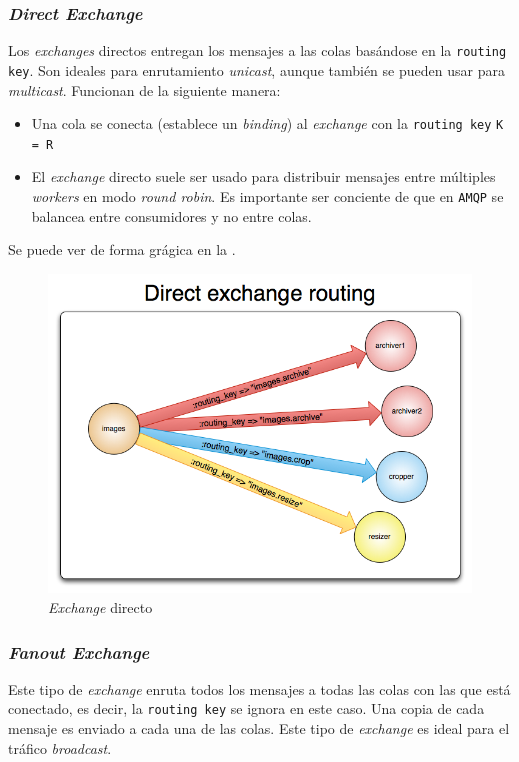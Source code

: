 \subsubsection{\emph{Direct Exchange}}

Los \emph{exchanges} directos entregan los mensajes a las colas basándose en
la \texttt{routing key}. Son ideales para enrutamiento \emph{unicast}, aunque
también se pueden usar para \emph{multicast}. Funcionan de la siguiente manera:

\begin{itemize}\itemsep1pt \parskip0pt 
\item Una cola se conecta (establece un \emph{binding}) al \emph{exchange} con
la \texttt{routing key} \texttt{K = R}
\item El \emph{exchange} directo suele ser usado para distribuir mensajes entre
múltiples \emph{workers} en modo \emph{round robin}. Es importante ser conciente
de que en \texttt{AMQP} se balancea entre consumidores y no entre colas.
\end{itemize}

Se puede ver de forma grágica en la .

\begin{figure}[htbp]
\centering
\includegraphics[width=0.75\linewidth]{03-mqtt_stomp_amqp/figuras/fig003}
\caption{\emph{Exchange} directo}
\label{fig:figura3}
\end{figure}

\subsubsection{\emph{Fanout Exchange}}

Este tipo de \emph{exchange} enruta todos los mensajes a todas las colas con las
que está conectado, es decir, la \texttt{routing key} se ignora en este caso.
Una copia de cada mensaje es enviado a cada una de las colas. Este tipo de
\emph{exchange} es ideal para el tráfico \emph{broadcast}.

